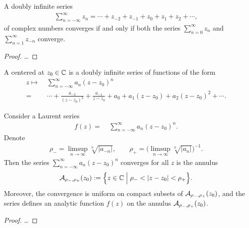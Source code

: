 \begin{lemma}
  \label{lem:convergence_doubly_infinite}
  A doubly infinite series
  \begin{align*}
    \sum_{n=-\infty}^\infty z_n
      = \cdots + z_{-2} + z_{-1} + z_0 + z_1 + z_2 + \cdots ,
  \end{align*}
  of complex numbers converges if and only if both the series
  $\sum_{n=0}^\infty z_n$ and $\sum_{n=1}^\infty z_{-n}$ converge.
\end{lemma}
\begin{proof}
  \ldots
\end{proof}

\begin{definition}
  \label{def:laurent_series}
  A  centered at $z_0 \in \mathbb{C}$ is a doubly infinite series
  of functions of the form
  \begin{align*}
    z \mapsto & \; \sum_{n=-\infty}^\infty a_n (z - z_0)^n \\
         = & \; \cdots + \frac{a_{-2}}{(z-z_0)^2} + \frac{a_{-1}}{z-z_0}
                + a_0 + a_1 (z-z_0) + a_2 (z-z_0)^2 + \cdots .
  \end{align*}
\end{definition}

\begin{lemma}
  \label{lem:laurent_series_analytic}
  Consider a Laurent series
  \begin{align*}
    f(z) = & \; \sum_{n=-\infty}^\infty a_n (z - z_0)^n .
  \end{align*}
  Denote
  \begin{align*}
    \rho_- = \limsup_{n \to \infty} \sqrt[n]{|a_{-n}|}, \qquad
    \rho_+ = \Big( \limsup_{n \to \infty} \sqrt[n]{|a_{n}|} \Big)^{-1} .
  \end{align*}
  Then the series $\sum_{n=-\infty}^\infty a_n (z - z_0)^n$
  converges for all $z$ is the annulus
  \begin{align*}
    \mathcal{A}_{\rho_-,\rho_+}(z_0)
      := \Big\{ z \in \mathbb{C} \; \Big| \; \rho_- < |z-z_0| < \rho_+ \Big\} .
  \end{align*}
  Moreover, the convergence is uniform on compact subsets
  of $\mathcal{A}_{\rho_-,\rho_+}(z_0)$, and the series defines an analytic
  function $f(z)$ on the annulus $\mathcal{A}_{\rho_-,\rho_+}(z_0)$.
\end{lemma}
\begin{proof}
  \ldots
\end{proof}

